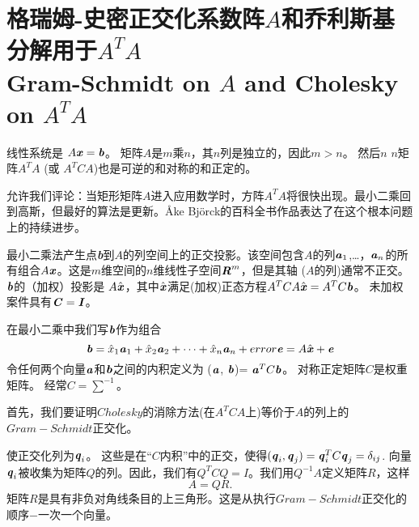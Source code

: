 \section[格瑞姆-史密正交化系数阵$A$和乔利斯基分解用于$A^{T}A$]{格瑞姆-史密正交化系数阵$A$和乔利斯基分解用于$A^{T}A$\\Gram-Schmidt on $A$ and Cholesky on $A^{T}A$}

\begin{flushleft}
	线性系统是 $A\textbf{\textit{x}}=\textbf{\textit{b}}$。 矩阵$A$是$m$乘$n$，其$n$列是独立的，因此$m> n$。 然后$n$ \texttimes $n$矩阵$A^{T}A$ (或 $A^{T}CA$)也是可逆的和对称的和正定的。
\end{flushleft}
允许我们评论：当矩形矩阵$A$进入应用数学时，方阵$A^{T}A$将很快出现。最小二乘回到高斯，但最好的算法是更新。\AA{}ke Bj\"{o}rck的百科全书作品表达了在这个根本问题上的持续进步。

最小二乘法产生点\textbf{\textit{b}}到$A$的列空间上的正交投影。该空间包含$A$的列$\textbf{\textit{a}}_{1}$,…，$\textbf{\textit{a}}_{n}$的所有组合$A\textbf{\textit{x}}$。这是$m$维空间的$n$维线性子空间$\textbf{\textit{R}}^{m}$，但是其轴 ($A$的列)通常不正交。 $\textbf{\textit{b}}$的（加权）投影是 $A\hat{\textbf{\textit{x}}}$，其中$\hat{\textbf{\textit{x}}}$满足(加权)正态方程$A^{T}CA\hat{\textbf{\textit{x}}}=A^{T}C\textbf{\textit{b}}$。 未加权案件具有$\textbf{\textit{C}}=\textbf{\textit{I}}$。

在最小二乘中我们写$\textbf{\textit{b}}$作为组合
\begin{equation}\label{eq:6.1}
\textbf{\textit{b}}=\hat{x}_{1}\textbf{\textit{a}}_{1}+\hat{x}_{2}\textbf{\textit{a}}_{2}+\cdots+\hat{x}_{n}\textbf{\textit{a}}_{n}+error\textbf{\textit{e}}=A\hat{\textbf{\textit{x}}}+\textbf{\textit{e}}
\end{equation}
令任何两个向量$\textbf{\textit{a}}$和$\textbf{\textit{b}}$之间的内积定义为 ($\textbf{\textit{a}}$, $\textbf{\textit{b}}$)= $\textbf{\textit{a}}^{T}C\textbf{\textit{b}}$。 对称正定矩阵$C$是权重矩阵。 经常$C=\sum^{-1}$。

首先，我们要证明$Cholesky$的消除方法(在$A^{T}CA$上)等价于$A$的列上的$Gram-Schmidt$正交化。

使正交化列为$\textbf{\textit{q}}_{i}$。 这些是在“$C$内积”中的正交，使得$(\textbf{\textit{q}}_{i},\textbf{\textit{q}}_{j})=\textbf{\textit{q}}^T_iC\textbf{\textit{q}}_{j}=\delta_{ij}$. 向量$\textbf{\textit{q}}_{i}$被收集为矩阵$Q$的列。因此，我们有$Q^{T}CQ=I $。我们用$Q^{-1} A$定义矩阵$R$，这样
$$A=QR.$$
矩阵$R$是具有非负对角线条目的上三角形。这是从执行$Gram-Schmidt$正交化的顺序$-$一次一个向量。

